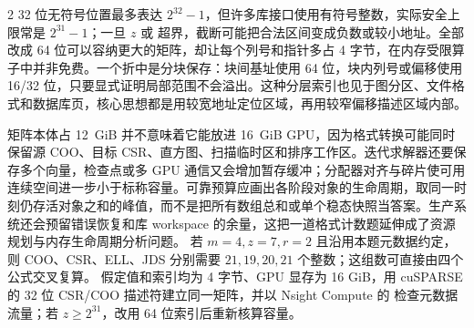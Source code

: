 \begin{solutionexercise}{2}
32 位无符号位置最多表达 $2^{32}-1$，但许多库接口使用有符号整数，实际安全上限常是 $2^{31}-1$；一旦 $z$ 或  超界，截断可能把合法区间变成负数或较小地址。全部改成 64 位可以容纳更大的矩阵，却让每个列号和指针多占 4 字节，在内存受限算子中并非免费。一个折中是分块保存：块间基址使用 64 位，块内列号或偏移使用 16/32 位，只要显式证明局部范围不会溢出。这种分层索引也见于图分区、文件格式和数据库页，核心思想都是用较宽地址定位区域，再用较窄偏移描述区域内部。

矩阵本体占 12~GiB 并不意味着它能放进 16~GiB GPU，因为格式转换可能同时保留源 COO、目标 CSR、直方图、扫描临时区和排序工作区。迭代求解器还要保存多个向量，检查点或多 GPU 通信又会增加暂存缓冲；分配器对齐与碎片使可用连续空间进一步小于标称容量。可靠预算应画出各阶段对象的生命周期，取同一时刻仍存活对象之和的峰值，而不是把所有数组总和或单个稳态快照当答案。生产系统还会预留错误恢复和库 workspace 的余量，这把一道格式计数题延伸成了资源规划与内存生命周期分析问题。
\variantheading 若 $m=4,z=7,r=2$ 且沿用本题元数据约定，则 COO、CSR、ELL、JDS 分别需要 $21,19,20,21$ 个整数；这组数可直接由四个公式交叉复算。
\practiceheading 假定值和索引均为 4 字节、GPU 显存为 16 GiB，用 cuSPARSE 的 32 位 CSR/COO 描述符建立同一矩阵，并以 Nsight Compute 的  检查元数据流量；若 $z\ge2^{31}$，改用 64 位索引后重新核算容量。
\end{solutionexercise}

